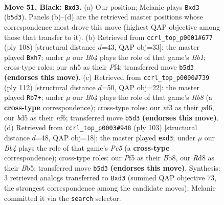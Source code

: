 \documentclass[11pt]{article}
\begin{document}
\clearpage

\begin{figure}[p]\centering
\begin{subfigure}{0.46\textwidth}\centering
\resizebox{\linewidth}{!}{%
\newchessgame
\chessboard[
  setfen={3r4/k7/8/1b1B1p1N/1P6/3R1N2/2R3P1/2K5 b - - 0 51},
  showmover=false,
  pgfstyle=straightmove, color=movearrow, markmove={b5-d3}
]}
\caption{}
\end{subfigure}\hfill
\begin{subfigure}{0.46\textwidth}\centering
\resizebox{\linewidth}{!}{%
\newchessgame
\chessboard[
  setfen={1r2k3/2R1b2r/8/8/5P2/6P1/1p4K1/1B6 w - - 0 55},
  showmover=false,
  pgfstyle=straightmove, color=movearrow, markmove={b1-h7}
]}
\caption{}
\end{subfigure}
\\[4pt]
\begin{subfigure}{0.46\textwidth}\centering
\resizebox{\linewidth}{!}{%
\newchessgame
\chessboard[
  setfen={1R6/5k2/3prn2/p7/8/3K4/2P5/5R2 w - - 2 57},
  showmover=false,
  pgfstyle=straightmove, color=movearrow, markmove={b8-b7}
]}
\caption{}
\end{subfigure}\hfill
\begin{subfigure}{0.46\textwidth}\centering
\resizebox{\linewidth}{!}{%
\newchessgame
\chessboard[
  setfen={1b6/8/8/1b3p2/2N1p2k/3R4/5P2/2R2K2 b - - 1 52},
  showmover=false,
  pgfstyle=straightmove, color=movearrow, markmove={e4-d3}
]}
\caption{}
\end{subfigure}
\caption{\textbf{Move 51, Black: \texttt{Bxd3}.} (a) Our position; Melanie plays \texttt{Bxd3} (\texttt{b5d3}). Panels (b)--(d) are the retrieved master positions whose correspondence most drove this move (highest QAP objective among those that transfer to it). (b) Retrieved from \texttt{ccrl\_top\_p0001\#677} (ply 108) [structural distance $d$=43, QAP obj=33]: the master played \texttt{Bxh7}; under $\mu$ our \emph{Bb4} plays the role of that game's \emph{Bb1}; cross-type roles: our \emph{n}h5 as their \emph{P}f4; transferred move \texttt{b5d3} \textbf{(endorses this move)}. (c) Retrieved from \texttt{ccrl\_top\_p0000\#739} (ply 112) [structural distance $d$=50, QAP obj=22]: the master played \texttt{Rb7+}; under $\mu$ our \emph{Bb4} plays the role of that game's \emph{Rb8} (a \textbf{cross-type} correspondence); cross-type roles: our \emph{n}f3 as their \emph{p}d6, our \emph{b}d5 as their \emph{n}f6; transferred move \texttt{b5d3} \textbf{(endorses this move)}. (d) Retrieved from \texttt{ccrl\_top\_p0003\#948} (ply 103) [structural distance $d$=48, QAP obj=18]: the master played \texttt{exd3}; under $\mu$ our \emph{Bb4} plays the role of that game's \emph{Pe5} (a \textbf{cross-type} correspondence); cross-type roles: our \emph{P}f5 as their \emph{B}b8, our \emph{R}d8 as their \emph{B}b5; transferred move \texttt{b5d3} \textbf{(endorses this move)}. Synthesis: 3 retrieved analogs transferred to \texttt{Bxd3} (summed QAP objective 73, the strongest correspondence among the candidate moves); Melanie committed it via the \texttt{search} selector.}
\label{fig:thought-m101}
\end{figure}
\end{document}
